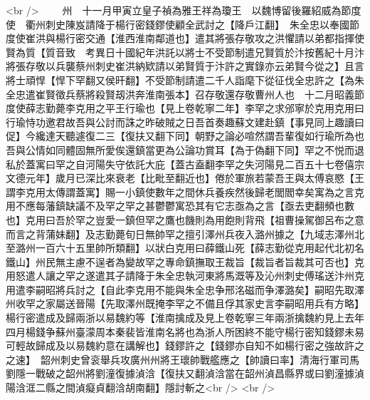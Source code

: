 <br />
　　州　十一月甲寅立皇子禎為雅王祥為瓊王　以魏博留後羅紹威為節度使　衢州刺史陳岌請降于楊行密錢鏐使顧全武討之【降戶江翻】　朱全忠以奉國節度使崔洪與楊行密交通【淮西淮南鄰道也】遣其將張存敬攻之洪懼請以弟都指揮使賢為質【質音致　考異日十國紀年洪託以將士不受節制遣兄賢質於汴按舊紀十月汴將張存敬以兵襲蔡州刺史崔洪納欵請以弟賢質于汴許之實錄亦云弟賢今從之】且言將士頑悍【悍下罕翻又侯旰翻】不受節制請遣二千人詣麾下從征伐全忠許之【為朱全忠遣崔賢徵兵蔡將殺賢刼洪奔淮南張本】召存敬還存敬曹州人也　十二月昭義節度使薛志勤薨李克用之平王行瑜也【見上卷乾寧二年】李罕之求邠寧於克用克用曰行瑜恃功邀君故吾與公討而誅之昨破賊之日吾首奏趣蘇文建赴鎮【事見同上趣讀曰促】今纔達天聽遽復二三【復扶又翻下同】朝野之論必喧然謂吾輩復如行瑜所為也吾與公情如同體固無所愛俟還鎮當更為公論功賞耳【為于偽翻下同】罕之不悦而退私於蓋寓曰罕之自河陽失守依託大庇【蓋古盍翻李罕之失河陽見二百五十七卷僖宗文德元年】歲月已深比來衰老【比毗至翻近也】倦於軍旅若蒙吾王與太傅哀愍【王謂李克用太傳謂蓋寓】賜一小鎮使數年之間休兵養疾然後歸老閭閻幸矣寓為之言克用不應每藩鎮缺議不及罕之罕之甚鬱鬱寓恐其有它志亟為之言【亟去吏翻頻也數也】克用曰吾於罕之豈愛一鎮但罕之鷹也饑則為用飽則背飛【祖曹操駕御呂布之意而言之背蒲妹翻】及志勤薨旬日無帥罕之擅引澤州兵夜入潞州據之【九域志澤州北至潞州一百六十五里帥所類翻】以狀白克用曰薛鐵山死【薛志勤從克用起代北初名鐵山】州民無主慮不逞者為變故罕之專命鎮撫取王裁旨【裁旨者旨裁其可否也】克用怒遣人讓之罕之遂遣其子請降于朱全忠執河東將馬溉等及沁州刺史傅瑤送汴州克用遣李嗣昭將兵討之【自此李克用不能與朱全忠争邢洺磁而争澤潞矣】嗣昭先取澤州收罕之家屬送晉陽【先取澤州既掩李罕之不備且俘其家史言李嗣昭用兵有方略】　楊行密遣成及歸兩浙以易魏約等【淮南擒成及見上卷乾寧三年兩浙擒魏約見上去年四月楊錢争蘇州臺濛周本秦裴皆淮南名將也為浙人所困終不能守楊行密知錢鏐未易可輕故歸成及以易魏約意在講解也】錢鏐許之【錢鏐亦自知不如楊行密之強故許之之速】　韶州刺史曾衮舉兵攻廣州州將王瓌帥戰艦應之【帥讀曰率】清海行軍司馬劉隱一戰破之韶州將劉潼復據湞浛【復扶又翻湞浛當在韶州湞昌縣界或曰劉潼據湞陽浛洭二縣之間湞癡貞翻浛胡南翻】隱討斬之<br />
<br />
